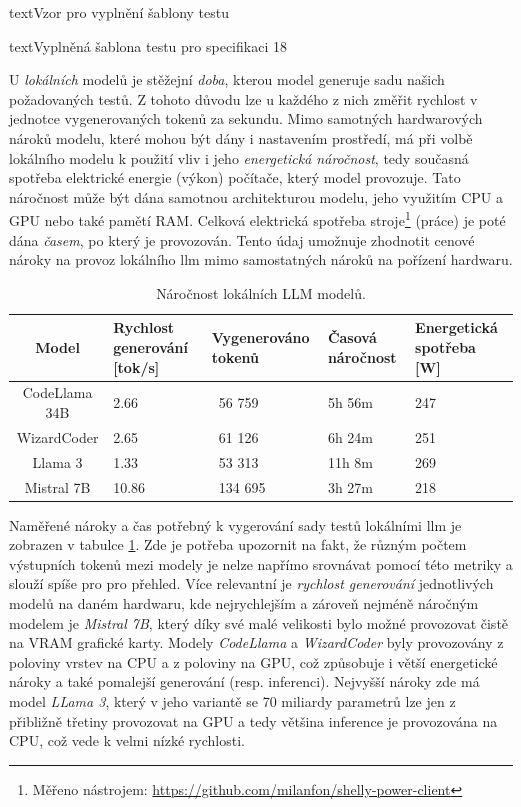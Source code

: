 \documentclass[czech, ma, kiv, he, iso690numb, pdf, viewonly]{fasthesis}
\begin{document}
\begin{code}{text}{Vzor pro vyplnění šablony testu \label{lst:template}}
{\begin{code}{text}{Vyplněná šablona testu pro specifikaci 18 \label{lst:spec18}}
{    U \textit{lokálních} modelů je stěžejní \textit{doba}, kterou model generuje sadu našich požadovaných testů. Z tohoto důvodu lze u každého z nich změřit rychlost v jednotce vygenerovaných tokenů za sekundu. Mimo samotných hardwarových nároků modelu, které mohou být dány i nastavením prostředí, má při volbě lokálního modelu k použití vliv i jeho \textit{energetická náročnost}, tedy současná spotřeba elektrické energie (výkon) počítače, který model provozuje. Tato náročnost může být dána samotnou architekturou modelu, jeho využitím CPU a GPU nebo také pamětí RAM. \cite{zhang2023hardware} Celková elektrická spotřeba stroje\footnote{Měřeno nástrojem: \url{https://github.com/milanfon/shelly-power-client}} (práce) je poté dána \textit{časem}, po který je provozován. Tento údaj umožnuje zhodnotit cenové nároky na provoz lokálního \Gls{llm} mimo samostatných nároků na pořízení hardwaru.

    \begin{table}[H]
        \begin{tabular}{|c|p{2.5cm}|p{2.5cm}|p{2cm}|p{2cm}|}
            \hline
            \textbf{Model} & \textbf{Rychlost \linebreak generování} [tok/s] & \textbf{Vygenerováno tokenů} & \textbf{Časová \linebreak náročnost} & \textbf{Energetická spotřeba} [W] \\
            \hline
            CodeLlama 34B & 2.66 & 56 759 & 5h 56m & 247 \\
            \hline
            WizardCoder & 2.65 & 61 126 & 6h 24m & 251 \\
            \hline
            Llama 3 & 1.33 & 53 313 & 11h 8m & 269 \\
            \hline
            Mistral 7B & 10.86 & 134 695 & 3h 27m & 218 \\
            \hline
        \end{tabular}
        \centering
        \caption{Náročnost lokálních LLM modelů.}
        \label{tab:eval:local}
    \end{table}
 
    Naměřené nároky a čas potřebný k vygerování sady testů lokálními \Gls{llm} je zobrazen v tabulce \ref{tab:eval:local}. Zde je potřeba upozornit na fakt, že různým počtem výstupních tokenů mezi modely je nelze napřímo srovnávat pomocí této metriky a slouží spíše pro pro přehled. Více relevantní je \textit{rychlost generování} jednotlivých modelů na daném hardwaru, kde nejrychlejším a zároveň nejméně náročným modelem je \textit{Mistral 7B}, který díky své malé velikosti bylo možné provozovat čistě na VRAM grafické karty. Modely \textit{CodeLlama} a \textit{WizardCoder} byly provozovány z poloviny vrstev na CPU a z poloviny na GPU, což způsobuje i větší energetické nároky a také pomalejší generování (resp. inferenci). Nejvyšší nároky zde má model \textit{LLama 3}, který v jeho variantě se 70 miliardy parametrů lze jen z přibližně třetiny provozovat na GPU a tedy většina inference je provozována na CPU, což vede k velmi nízké rychlosti.

}
\end{code}}
\end{code}
\end{document}
